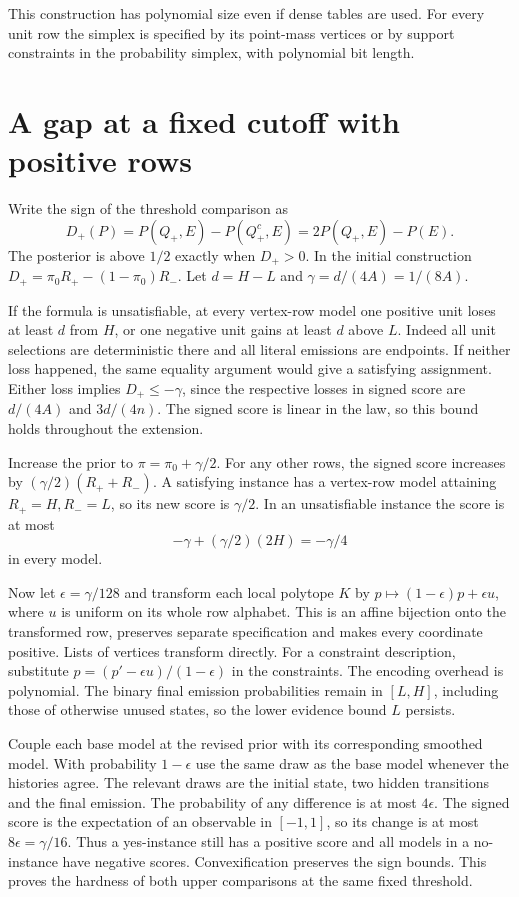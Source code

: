 \documentclass[11pt,a4paper]{amsart}
\begin{document}
This construction has polynomial size even if dense tables
are used. For every unit row the simplex is specified by its
point-mass vertices or by support constraints in the
probability simplex, with polynomial bit length.

\section{A gap at a fixed cutoff with positive rows}

Write the sign of the threshold comparison as
\[
 D_+(P)=P(Q_+,E)-P(Q_+^c,E)
       =2P(Q_+,E)-P(E).
\]
The posterior is above \(1/2\) exactly when \(D_+>0\).
In the initial construction \(D_+=\pi_0R_+-(1-\pi_0)R_-\).
Let \(d=H-L\) and \(\gamma=d/(4A)=1/(8A)\).

If the formula is unsatisfiable, at every vertex-row model
one positive unit loses at least \(d\) from \(H\), or one
negative unit gains at least \(d\) above \(L\). Indeed all
unit selections are deterministic there and all literal
emissions are endpoints. If neither loss happened, the
same equality argument would give a satisfying assignment.
Either loss implies \(D_+\le-\gamma\), since the respective
losses in signed score are \(d/(4A)\) and \(3d/(4n)\).
The signed score is linear in the law, so this bound holds
throughout the extension.

Increase the prior to \(\pi=\pi_0+\gamma/2\).
For any other rows, the signed score increases by
\((\gamma/2)(R_++R_-)\). A satisfying instance has a
vertex-row model attaining \(R_+=H,R_-=L\), so its new
score is \(\gamma/2\). In an unsatisfiable instance the
score is at most
\[
    -\gamma + (\gamma/2)(2H)=-\gamma/4
\]
in every model.

Now let \(\epsilon=\gamma/128\) and transform each local
polytope \(K\) by \(p\mapsto(1-\epsilon)p+\epsilon u\),
where \(u\) is uniform on its whole row alphabet. This is
an affine bijection onto the transformed row, preserves separate
specification and makes every coordinate positive. Lists of
vertices transform directly. For a constraint description,
substitute \(p=(p'-\epsilon u)/(1-\epsilon)\) in the constraints.
The encoding overhead is polynomial. The binary final
emission probabilities remain in \([L,H]\), including those
of otherwise unused states, so the lower evidence bound \(L\)
persists.

Couple each base model at the revised prior with its
corresponding smoothed model. With probability \(1-\epsilon\)
use the same draw as the base model whenever the histories
agree. The relevant draws are the initial state, two hidden
transitions and the final emission. The probability of any
difference is at most \(4\epsilon\). The signed score is the
expectation of an observable in \([-1,1]\), so its change
is at most \(8\epsilon=\gamma/16\). Thus a yes-instance
still has a positive score and all models in a no-instance
have negative scores. Convexification preserves the sign
bounds. This proves the hardness of both upper comparisons
at the same fixed threshold.
\end{document}
